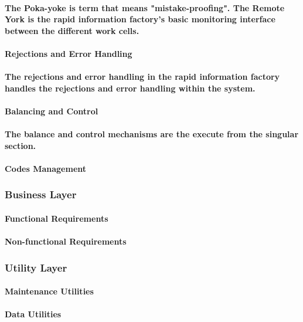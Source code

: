 \documentclass{acm_proc_article-sp}
\begin{document}
\paragraph{The Poka-yoke is term that means "mistake-proofing". The Remote York is the rapid information factory's basic monitoring interface between the different work cells. }
\paragraph{\textbf{Rejections and Error Handling}}
\paragraph{The rejections and error handling in the rapid information factory handles the rejections and error handling within the system.}
\paragraph{Balancing and Control}
\paragraph{The balance and control mechanisms are the execute from the singular section.}
\paragraph{Codes Management}
\subsubsection{Business Layer}
\paragraph{Functional Requirements}
\paragraph{Non-functional Requirements}
\subsubsection{Utility Layer}
\paragraph{Maintenance Utilities}
\paragraph{Data Utilities}
\end{document}
